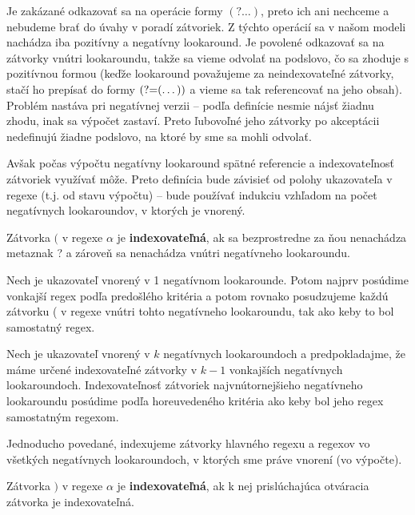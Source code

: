 Je zakázané odkazovať sa na operácie formy $(?\dots )$, preto ich ani nechceme a nebudeme brať do úvahy v poradí zátvoriek. Z týchto operácií sa v našom modeli nachádza iba pozitívny a negatívny lookaround. Je povolené odkazovať sa na zátvorky vnútri lookaroundu, takže sa vieme odvolať na podslovo, čo sa zhoduje s pozitívnou formou (keďže lookaround považujeme za neindexovateľné zátvorky, stačí ho prepísať do formy $\text{(?=} (\dots ))$ a vieme sa tak referencovať na jeho obsah). Problém nastáva pri negatívnej verzii -- podľa definície nesmie nájsť žiadnu zhodu, inak sa výpočet zastaví. Preto ľubovoľné jeho zátvorky po akceptácii nedefinujú žiadne podslovo, na ktoré by sme sa mohli odvolať.

Avšak počas výpočtu negatívny lookaround spätné referencie a indexovateľnosť zátvoriek využívať môže. Preto definícia bude závisieť od polohy ukazovateľa v regexe (t.j. od stavu výpočtu) -- bude používať indukciu vzhľadom na počet negatívnych lookaroundov, v ktorých je vnorený.

\begin{df}\label{indexovatelnost_(}
Zátvorka $($ v regexe $\alpha$ je \textbf{indexovateľná}, ak sa bezprostredne za ňou nenachádza metaznak ? a zároveň sa nenachádza vnútri negatívneho lookaroundu.

Nech je ukazovateľ vnorený v 1 negatívnom lookarounde. Potom najprv posúdime vonkajší regex podľa  predošlého kritéria a potom rovnako posudzujeme každú zátvorku ( v regexe vnútri tohto negatívneho look\-aroundu, tak ako keby to bol samostatný regex.

Nech je ukazovateľ vnorený v $k$ negatívnych lookaroundoch a predpokladajme, že máme určené indexovateľné zátvorky v $k-1$ vonkajších negatívnych lookaroundoch. Indexovateľnosť zátvoriek najvnútornejšieho negatívneho lookaroundu posúdime podľa horeuvedeného kritéria ako keby bol jeho regex samostatným regexom.
\end{df}

Jednoducho povedané, indexujeme zátvorky hlavného regexu a regexov vo všetkých negatívnych lookaroundoch, v ktorých sme práve vnorení (vo výpočte).

\begin{df}\label{indexovatelnost_)}
Zátvorka $)$ v regexe $\alpha$ je \textbf{indexovateľná}, ak k nej prislúchajúca otváracia zátvorka je indexovateľná.
\end{df}

